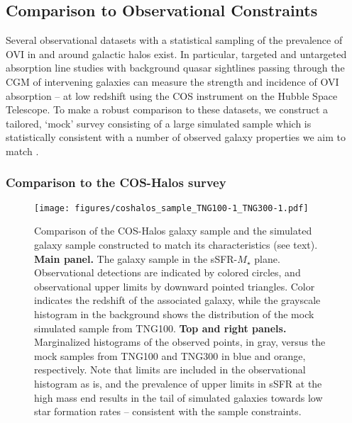 \documentclass[useAMS,usenatbib]{mnras}
\newcommand{\ovi}{OVI\xspace}
\begin{document}
\subsection{Comparison to Observational Constraints}

Several observational datasets with a statistical sampling of the prevalence of \ovi in and around galactic halos exist. In particular, targeted and untargeted absorption line studies with background quasar sightlines passing through the CGM of intervening galaxies can measure the strength and incidence of \ovi absorption -- at low redshift using the COS instrument on the Hubble Space Telescope. To make a robust comparison to these datasets, we construct a tailored, `mock' survey consisting of a large simulated sample which is statistically consistent with a number of observed galaxy properties we aim to match \citep[similar in spirit to][]{oppenheimer16}. 

\subsubsection{Comparison to the COS-Halos survey}

\begin{figure*}
\centering
\texttt{[image: figures/coshalos\_sample\_TNG100-1\_TNG300-1.pdf]}
\caption{ Comparison of the COS-Halos galaxy sample and the simulated galaxy sample constructed to match its characteristics (see text). \textbf{Main panel.} The galaxy sample in the sSFR-$M_\star$ plane. Observational detections are indicated by colored circles, and observational upper limits by downward pointed triangles. Color indicates the redshift of the associated galaxy, while the grayscale histogram in the background shows the distribution of the mock simulated sample from TNG100. \textbf{Top and right panels.} Marginalized histograms of the observed points, in gray, versus the mock samples from TNG100 and TNG300 in blue and orange, respectively. Note that limits are included in the observational histogram as is, and the prevalence of upper limits in sSFR at the high mass end results in the tail of simulated galaxies towards low star formation rates -- consistent with the sample constraints.
 \label{fig_coshalos_sample}}
\end{figure*}
\end{document}
